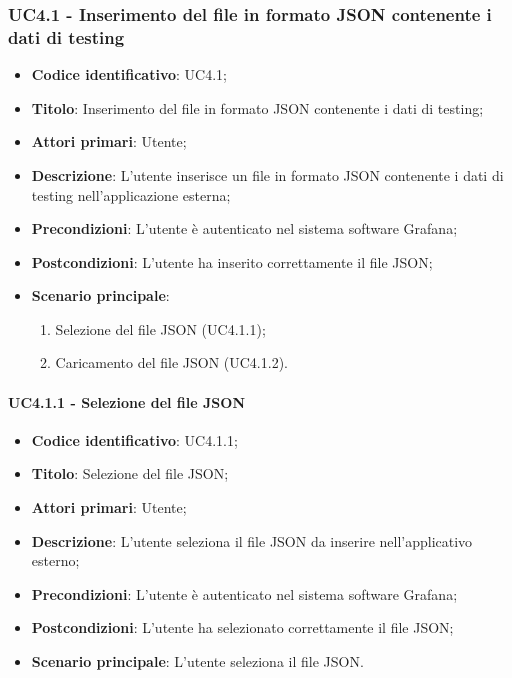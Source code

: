 \subsubsection{UC4.1 - Inserimento del file in formato JSON contenente i dati di testing}
\begin{itemize}
    \item \textbf{Codice identificativo}: UC4.1;
    \item \textbf{Titolo}: Inserimento del file in formato JSON contenente i dati di testing;
    \item \textbf{Attori primari}: Utente;
    \item \textbf{Descrizione}: L'utente inserisce un file in formato JSON contenente i dati di testing nell'applicazione esterna;
    \item \textbf{Precondizioni}: L'utente è autenticato nel sistema software Grafana\glo;
    \item \textbf{Postcondizioni}: L'utente ha inserito correttamente il file JSON;
    \item \textbf{Scenario principale}:
		\begin{enumerate}
			\item Selezione del file JSON (UC4.1.1);
			\item Caricamento del file JSON (UC4.1.2).
		\end{enumerate}
\end{itemize}

\paragraph{UC4.1.1 - Selezione del file JSON}
\begin{itemize}
	\item \textbf{Codice identificativo}: UC4.1.1;
	\item \textbf{Titolo}: Selezione del file JSON;
	\item \textbf{Attori primari}: Utente;
	\item \textbf{Descrizione}: L'utente seleziona il file JSON da inserire nell'applicativo esterno;
	\item \textbf{Precondizioni}: L'utente è autenticato nel sistema software Grafana\glo;
	\item \textbf{Postcondizioni}: L'utente ha selezionato correttamente il file JSON;
	\item \textbf{Scenario principale}: L'utente seleziona il file JSON.
\end{itemize}

